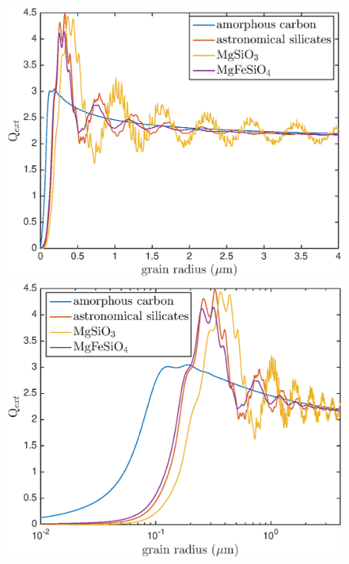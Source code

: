 \documentclass[useAMS,usenatbib,usegraphicx]{mnras}
\begin{document}
\begin{figure}
\centering
\includegraphics[trim=0 0 0 0,clip=true,scale=0.43]{Qext_grainsize_upto4_2}
\includegraphics[trim = 0 0 0 0,clip=true,scale=0.43]{Qext_grainsize_upto4_log_2}
\\
\hspace{0.001mm}

\end{figure}
\end{document}
